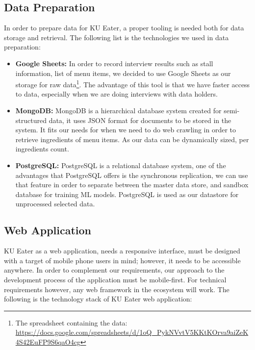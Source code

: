 \subsection{Data Preparation}
\label{subsection:data-preparation-system}
In order to prepare data for KU Eater, a proper tooling is needed both for data storage and retrieval. The following list is the technologies we used in data preparation:

\begin{itemize}[leftmargin=80pt]
    \item \textbf{Google Sheets:} In order to record interview results such as stall information, list of menu items, we decided to use Google Sheets as our storage for raw data\footnote{The spreadsheet containing the data: \url{https://docs.google.com/spreadsheets/d/1oQ_PykNVvtV5KKtKOrva9aiZeK4S42EuFP9S6qaO4cg}}.
    The advantage of this tool is that we have faster access to data, especially when we are doing interviews with data holders.
    \item \textbf{MongoDB:} MongoDB is a hierarchical database system created for semi-structured data, it uses JSON format for documents to be stored in the system. It fits our needs for when we need to do web crawling in order to retrieve ingredients of menu items. As our data can be dynamically sized, per ingredients count.
    \item \textbf{PostgreSQL:} PostgreSQL is a relational database system, one of the advantages that PostgreSQL offers is the synchronous replication, we can use that feature in order to separate between the master data store, and sandbox database for training ML models.
    PostgreSQL is used as our datastore for unprocessed selected data.
\end{itemize}

\subsection{Web Application}
\label{subsection:web-application}
KU Eater as a web application, needs a responsive interface, must be designed with a target of mobile phone users in mind; however, it needs to be accessible anywhere.
In order to complement our requirements, our approach to the development process of the application must be mobile-first. For technical requirements however, any web framework
in the ecosystem will work. The following is the technology stack of KU Eater web application:

